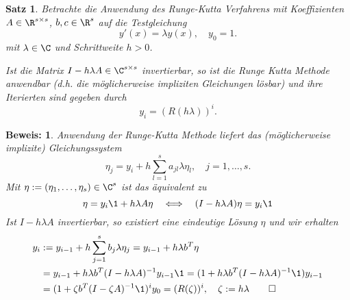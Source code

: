 \documentclass[
]{mycourse}
\theoremstyle{mythm}
\newtheorem{theorem}{Satz}[chapter]
\theoremstyle{break}
\newtheorem*{beweis}{Beweis:}
\begin{document}
\begin{theorem}\label{thm:R_for_RK}
Betrachte die Anwendung des Runge-Kutta Verfahrens mit Koeffizienten $A\in \R^{s\times s}$, $b,c\in \R^s$ 
auf die Testgleichung
\[
y'(x)=\lambda y(x), \quad y_0=1. 
\]
mit $\lambda\in \C$ und Schrittweite $h>0$.

Ist die Matrix $I-h \lambda A\in \C^{s\times s}$ invertierbar, so ist die Runge Kutta Methode 
anwendbar (d.h. die möglicherweise impliziten Gleichungen lösbar) und ihre Iterierten sind gegeben durch
\[
y_i=(R(h\lambda))^i.
\]
\end{theorem}
\begin{beweis}
Anwendung der Runge-Kutta Methode liefert das (möglicherweise implizite) Gleichungssystem
\[
\eta_j = y_i + h \sum_{l=1}^s a_{jl} \lambda \eta_l, \quad j=1,\ldots,s.
\]
Mit $\eta:=(\eta_1,\ldots,\eta_s)\in \C^s$ ist das äquivalent zu 
\[
\eta = y_i \1 + h\lambda A \eta \quad \Longleftrightarrow \quad (I-h\lambda A )\eta = y_i \1
\]
Ist $I-h \lambda A$ invertierbar, so existiert eine eindeutige Lösung $\eta$ und wir erhalten
\begin{align*}
y_{i}&:=y_{i-1} +  h \sum_{j=1}^s b_j \lambda \eta_j= y_{i-1} + h \lambda b^T \eta\\
&= y_{i-1} + h \lambda b^T (I-h\lambda A )^{-1} y_{i-1} \1 
= (1+h \lambda b^T (I-h\lambda A )^{-1} \1)y_{i-1}\\
&= (1+\zeta b^T (I- \zeta A )^{-1} \1)^{i} y_0=(R(\zeta))^i, \quad \zeta:=h\lambda\qquad \Box
\end{align*}
\end{beweis}
\end{document}
